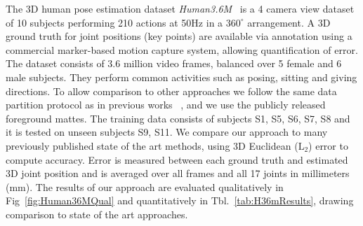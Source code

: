 \documentclass[runningheads]{llncs}
\begin{document}
The 3D human pose estimation dataset {\em Human3.6M}~\cite{h36m_pami} is a 4 camera view dataset of 10 subjects performing 210 actions at 50Hz in a $360^\circ$ arrangement. A 3D ground truth for joint positions (key points) are available via annotation using  a commercial marker-based motion capture system, allowing quantification of error. The dataset consists of 3.6 million video frames, balanced over 5 female and 6 male subjects. They perform common activities such as posing, sitting and giving directions. To allow comparison to other approaches we follow the same data partition protocol as in previous works ~\cite{h36m_pami,li2015maximumH36m,tekin2016fusingH36m,lin2017CVPRRPSM,tome2017liftingH36m,martinez_simple_2017}, and we use the publicly released foreground mattes. 
The training data consists of subjects S1, S5, S6, S7, S8 and it is tested on unseen subjects S9, S11.  We compare our approach to many previously published state of the art methods, using 3D Euclidean ($\mathrm{L}_2$) error  to compute accuracy. Error is measured between each ground truth and estimated 3D joint position and is averaged over all frames and all 17 joints in millimeters (mm). The results of our approach  are evaluated  qualitatively in Fig~\ref{fig:Human36MQual} and quantitatively in Tbl.~\ref{tab:H36mResults}, drawing comparison to state of the art approaches.
\end{document}
